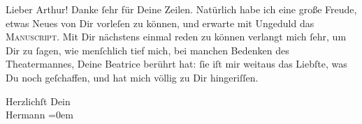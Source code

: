 \pstart{}Lieber Arthur!\pend\vspace{0.5em}
\pstart
           Danke{ }ſehr für Deine Zeilen. Natürlich habe ich eine große Freude, etwas Neues von
               Dir vorleſen zu können, und erwarte mit Ungeduld das \textsc{Manuscript}. Mit Dir nächstens einmal reden zu können verlangt mich{ }ſehr, um
               Dir zu{ }ſagen, wie menſchlich tief mich, bei manchen Bedenken des Theatermannes, Deine
                  Beatrice berührt hat:{ }ſie iſt mir weitaus das
               Liebſte, was \introOben{}Du\introOben{} noch geſchaffen, und hat mich völlig zu Dir
               hingeriſſen.\pend
           
\pstart
           Herzlichſt Dein{\\[\baselineskip]}\spacefill\mbox{Hermann}\pend
           \leftskip=0em{}\endnumbering{}  \newcommand{\dateiname}{L01077}\newcommand{\titel}{Hermann Bahr an Arthur Schnitzler, 12. 10. 1900}\newcommand{\editorInnen}{Herausgegeben von Martin Anton Müller}
